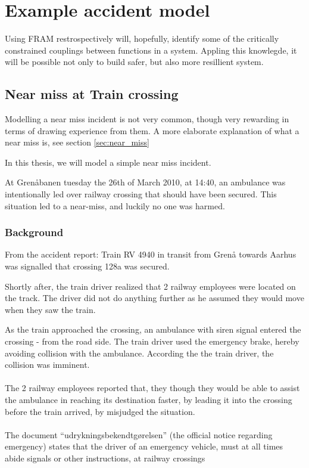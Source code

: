 \chapter{Example accident model}
\label{ch:accident_model}
Using FRAM restrospectively will, hopefully, identify some of the critically constrained couplings between functions in a system. Appling this knowlegde, it will be possible not only to build safer, but also more resillient system.

\section{Near miss at Train crossing}
Modelling a near miss incident is not very common, though very rewarding in terms of drawing experience from them. A more elaborate explanation of what a near miss is, see section \ref{sec:near_miss}

In this thesis, we will model a simple near miss incident.


At Grenåbanen tuesday the 26th of March 2010, at 14:40, an ambulance was intentionally led over railway crossing that should have been secured. This situation led to a near-miss, and luckily no one was harmed.\\

\subsection{Background}
From the accident report:
Train RV 4940 in transit from Grenå towards Aarhus was signalled that crossing 128a was secured.

Shortly after, the train driver realized that 2 railway employees were located on the track. The driver did not do anything further as he assumed they would move when they saw the train.

As the train approached the crossing, an ambulance with siren signal entered the crossing - from the road side. The train driver used the emergency brake, hereby avoiding collision with the ambulance. According the the train driver, the collision was imminent.\\
\\
The 2 railway employees reported that, they though they would be able to assist the ambulance in reaching its destination faster, by leading it into the crossing before the train arrived, by misjudged the situation.\\
\\
The document ``udrykningsbekendtgørelsen'' (the official notice regarding emergency) states that the driver of an emergency vehicle, must at all times abide signals or other instructions, at railway crossings

